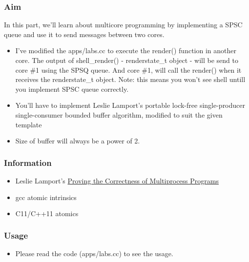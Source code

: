 \documentclass[]{book}
\begin{document}
\subsubsection*{Aim}\label{aim-8}

In this part, we'll learn about multicore programming by implementing a
SPSC queue and use it to send messages between two cores.

\begin{itemize}
\itemsep1pt\parskip0pt
\item
  I've modified the apps/labs.cc to execute the render() function in
  another core. The output of shell\_render() - renderstate\_t object -
  will be send to core \#1 using the SPSQ queue. And core \#1, will call
  the render() when it receives the renderstate\_t object. Note: this
  means you won't see shell untill you implement SPSC queue correctly.
\item
  You'll have to implement Leslie Lamport's portable lock-free
  single-producer single-consumer bounded buffer algorithm, modified to
  suit the given template
\item
  Size of buffer will always be a power of 2.
\end{itemize}

\subsubsection*{Information}\label{information-8}

\begin{itemize}
\itemsep1pt\parskip0pt
\item
  Leslie Lamport's \href{proving.pdf}{Proving the Correctness of
  Multiprocess Programs}
\item
  gcc atomic intrinsics
\item
  C11/C++11 atomics
\end{itemize}

\subsubsection*{Usage}\label{usage-8}

\begin{itemize}
\itemsep1pt\parskip0pt
\item
  Please read the code (apps/labs.cc) to see the usage.
\end{itemize}
\end{document}
